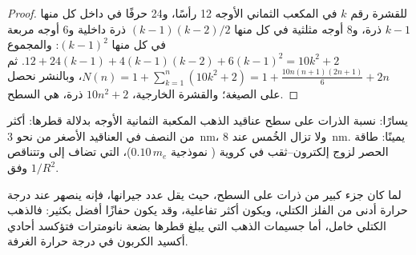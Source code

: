 \begin{proof}
للقشرة رقم $k$ في المكعب الثماني الأوجه 12 رأسًا، و24 حرفًا في داخل كل منها $k - 1$ ذرة،
و8 أوجه مثلثية في كل منها $(k - 1)(k - 2)/2$ ذرة داخلية و6
أوجه مربعة في كل منها $(k - 1)^2$: والمجموع $12 + 24(k - 1) + 4(k - 1)(k - 2) + 6(k - 1)^2 = 10k^2 + 2$. ثم
$N(n) = 1 + \sum_{k=1}^{n}(10k^2 + 2) = 1 + \frac{10n(n + 1)(2n + 1)}{6} + 2n$، وبالنشر نحصل على الصيغة؛ 
والقشرة الخارجية، $10n^2 + 2$ ذرة، هي السطح.
\end{proof}

\begin{omfigure}

{\small يسارًا: نسبة الذرات على سطح عناقيد الذهب المكعبة الثمانية الأوجه
بدلالة قطرها: أكثر من النصف في العناقيد الأصغر من نحو
\qty{3}{nm}، ولا تزال الخُمس عند \qty{8}{nm}. يمينًا: طاقة الحصر لزوج
إلكترون--ثقب في  كروية ( نموذجية $0.10\,m_e$)،
التي تضاف إلى  وتتناقص وفق $1/R^2$.}
\end{omfigure}

لما كان جزء كبير من ذرات  على السطح، حيث يقل عدد
جيرانها، فإنه ينصهر عند درجة حرارة أدنى من الفلز الكتلي،
ويكون أكثر تفاعلية، وقد يكون حفازًا أفضل بكثير: فالذهب الكتلي خامل، أما جسيمات
الذهب التي يبلغ قطرها بضعة نانومترات فتؤكسد أحادي أكسيد الكربون في درجة حرارة الغرفة.

